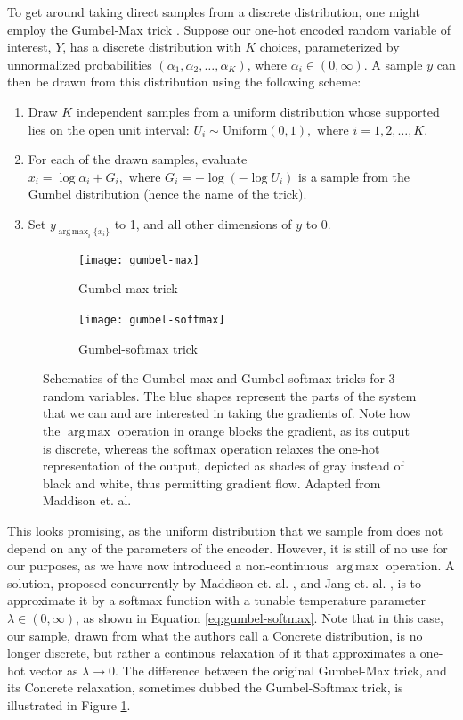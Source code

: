 \documentclass{report}
\DeclareMathOperator*{\argmax}{arg\,max}
\begin{document}
\noindent To get around taking direct samples from a discrete distribution, one might employ the Gumbel-Max trick \cite{Luce59}. Suppose our one-hot encoded random variable of interest, $Y$, has a discrete distribution with $K$ choices, parameterized by unnormalized probabilities $(\alpha_1, \alpha_2, \dots, \alpha_K)$, where $\alpha_i \in (0, \infty)$. A sample $y$ can then be drawn from this distribution using the following scheme:

\begin{enumerate}
  \item Draw $K$ independent samples from a uniform distribution whose supported lies on the open unit interval: $U_i \sim \text{Uniform}(0, 1), \text{ where } i = 1, 2, \dots, K$.
  \item For each of the drawn samples, evaluate $x_i = \log \alpha_i + G_i, \text{ where } G_i = -\log(-\log U_i)$ is a sample from the Gumbel distribution (hence the name of the trick).
  \item Set $y_{\argmax_i \{x_i\}}$ to 1, and all other dimensions of $y$ to 0.
\end{enumerate}

\begin{figure}
\begin{subfigure}{.5\textwidth}
  \centering
  \texttt{[image: gumbel-max]}
  \caption{Gumbel-max trick}
\end{subfigure}%
\begin{subfigure}{.5\textwidth}
  \centering
  \texttt{[image: gumbel-softmax]}
  \caption{Gumbel-softmax trick}
\end{subfigure}
\caption{Schematics of the Gumbel-max and Gumbel-softmax tricks for 3 random variables. The blue shapes represent the parts of the system that we can and are interested in taking the gradients of. Note how the $\argmax$ operation in orange blocks the gradient, as its output is discrete, whereas the softmax operation relaxes the one-hot representation of the output, depicted as shades of gray instead of black and white, thus permitting gradient flow. Adapted from Maddison et. al. \cite{concrete}}
\label{fig:concrete}
\end{figure}

\bigskip

\noindent This looks promising, as the uniform distribution that we sample from does not depend on any of the parameters of the encoder. However, it is still of no use for our purposes, as we have now introduced a non-continuous $\argmax$ operation. A solution, proposed concurrently by Maddison et. al. \cite{concrete}, and Jang et. al. \cite{gumbel-softmax}, is to approximate it by a softmax function with a tunable temperature parameter $\lambda \in (0, \infty)$, as shown in Equation \ref{eq:gumbel-softmax}. Note that in this case, our sample, drawn from what the authors call a Concrete distribution, is no longer discrete, but rather a continous relaxation of it that approximates a one-hot vector as $\lambda \rightarrow 0$. The difference between the original Gumbel-Max trick, and its Concrete relaxation, sometimes dubbed the Gumbel-Softmax trick, is illustrated in Figure \ref{fig:concrete}.
\end{document}
